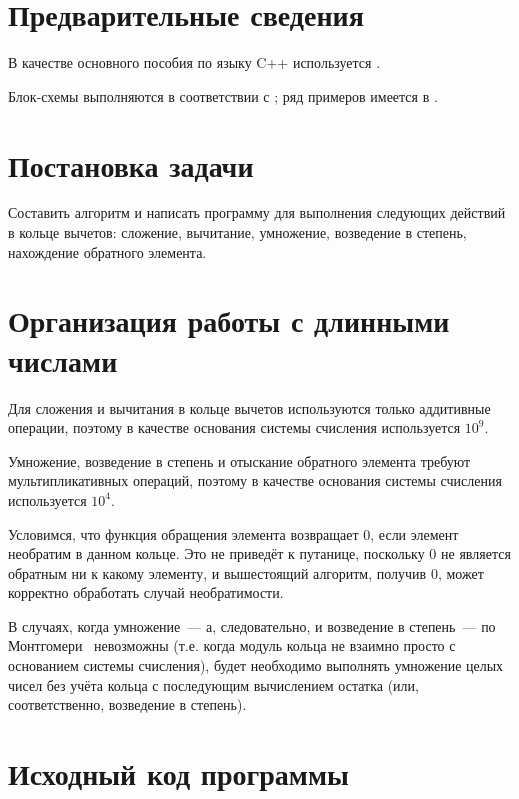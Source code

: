 \documentclass[a4paper,12pt]{article} %
\begin{document}
\setcounter{page}{2}

\section*{Предварительные сведения}

В качестве основного пособия по языку C++ используется \cite{chmyhalo}.


Блок-схемы выполняются в соответствии с \cite{gost-block-scheme};
ряд примеров имеется в \cite{wiki-block-scheme}.


\section*{Постановка задачи}
Составить алгоритм и написать программу
для выполнения следующих действий в кольце вычетов:
сложение, вычитание, умножение, возведение в степень,
нахождение обратного элемента.


\section*{Организация работы с длинными числами}
Для сложения и вычитания в кольце вычетов используются только аддитивные операции,
поэтому в качестве основания системы счисления используется $10^9$.

Умножение, возведение в степень и отыскание обратного элемента требуют
мультипликативных операций,
поэтому в качестве основания системы счисления используется $10^4$.

Условимся, что функция обращения элемента возвращает 0,
если элемент необратим в данном кольце.
Это не приведёт к путанице, поскольку 0 не является обратным ни к какому элементу,
и вышестоящий алгоритм, получив 0, может корректно обработать случай необратимости.

В случаях, когда умножение~--- а, следовательно, и возведение в степень~--- по Монтгомери~\cite{Glukhov}
невозможны (т.е. когда модуль кольца не взаимно просто с основанием системы счисления),
будет необходимо выполнять умножение целых чисел без учёта кольца с последующим вычислением остатка
(или, соответственно, возведение в степень).

\section*{Исходный код программы}







\end{document}
